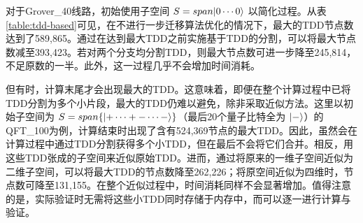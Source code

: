 对于Grover\_40线路，初始使用子空间 $S=span{\ket{0\cdots0}}$ 以简化过程。从表\ref{table:tdd-based}可见，在不进行一步迁移算法优化的情况下，最大的TDD节点数达到了589,865。通过在达到最大TDD之前实施基于TDD的分割，可以将最大节点数减至393,423。若对两个分支均分割TDD，则最大节点数可进一步降至245,814，不足原数的一半。此外，这一过程几乎不会增加时间消耗。
    
但有时，计算末尾才会出现最大的TDD。这意味着，即便在整个计算过程中已将TDD分割为多个小片段，最大的TDD仍难以避免，除非采取近似方法。这里以初始子空间为 $S=span\{\ket{+\cdots+ -\cdots -}\}$（最后20个量子比特全为 $\ket{-}$）的QFT\_100为例，计算结束时出现了含有524,369节点的最大TDD。因此，虽然会在计算过程中通过TDD分割获得多个小TDD，但在最后不会将它们合并。相反，用这些TDD张成的子空间来近似原始TDD。进而，通过将原来的一维子空间近似为二维子空间，可以将最大TDD的节点数降至262,226；将原空间近似为四维时，节点数可降至131,155。在整个近似过程中，时间消耗同样不会显著增加。值得注意的是，实际验证时无需将这些小TDD同时存储于内存中，而可以逐一进行计算与验证。

\begin{table}[]
    \centering
    \caption{TDD拆分与近似的优化方案}

    \label{table:tdd-based}
\end{table}

